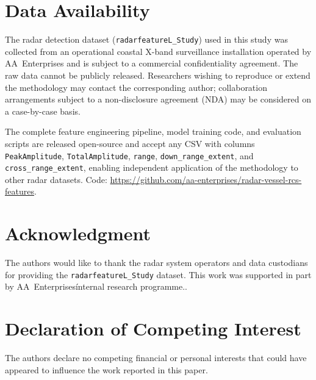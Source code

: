 \documentclass[journal]{IEEEtran}
\begin{document}
\section*{Data Availability}
The radar detection dataset (\texttt{radarfeatureL\_Study}) used in this
study was collected from an operational coastal X-band surveillance
installation operated by AA~Enterprises and is subject to a commercial
confidentiality agreement. The raw data cannot be publicly released.
Researchers wishing to reproduce or extend the methodology may contact
the corresponding author; collaboration arrangements subject to a
non-disclosure agreement (NDA) may be considered on a case-by-case basis.

The complete feature engineering pipeline, model training code, and
evaluation scripts are released open-source and accept any CSV with
columns \texttt{PeakAmplitude}, \texttt{TotalAmplitude}, \texttt{range},
\texttt{down\_range\_extent}, and \texttt{cross\_range\_extent}, enabling
independent application of the methodology to other radar datasets.
Code: \url{https://github.com/aa-enterprises/radar-vessel-rcs-features}.

\section*{Acknowledgment}
The authors would like to thank the radar system operators and data custodians for providing the \texttt{radarfeatureL\_Study} dataset. This work was supported in part by AA~Enterprises\' internal research programme..

\section*{Declaration of Competing Interest}
The authors declare no competing financial or personal interests that could have appeared to influence the work reported in this paper.
\end{document}
